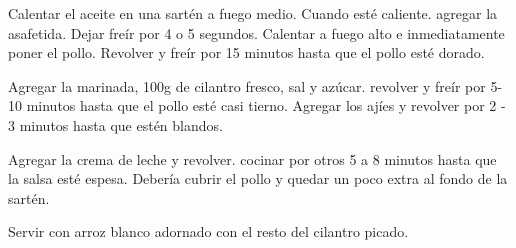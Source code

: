 \begin{recipe}
{        \step Calentar el aceite en una sart\'en a fuego medio. Cuando est\'e caliente. agregar la asafetida. Dejar fre\'ir por 4 o 5 segundos. Calentar a fuego alto e inmediatamente poner el pollo. Revolver y fre\'ir por 15 minutos hasta que el pollo est\'e dorado.
        
        \step Agregar la marinada, 100g de cilantro fresco, sal y az\'ucar. revolver y fre\'ir por 5-10 minutos hasta que el pollo est\'e casi tierno. Agregar los aj\'ies y revolver por 2 - 3 minutos hasta que est\'en blandos. 
        
        \step Agregar la crema de leche y revolver. cocinar por otros 5 a 8 minutos hasta que la salsa est\'e espesa. Deber\'ia cubrir el pollo y quedar un poco extra al fondo de la sart\'en.   
        
        \step Servir con arroz blanco adornado con el resto del cilantro picado.
    }
    
    
    
    \hint{%

    }
    
\end{recipe}